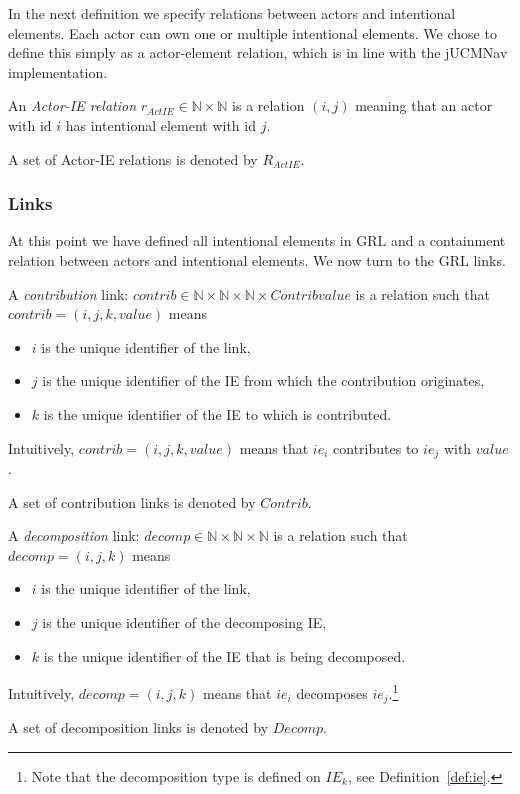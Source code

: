 In the next definition we specify relations between actors and intentional elements. Each actor can own one or multiple intentional elements. We chose to define this simply as a actor-element relation, which is in line with the jUCMNav implementation.


\begin{definition}
\label{def:act-ie-relation}
An \emph{Actor-IE relation} $r_{ActIE}\in\mathbb{N}\times\mathbb{N}$ is a relation $(i,j)$ meaning that an actor with id $i$ has intentional element with id $j$.

A set of Actor-IE relations is denoted by $R_{ActIE}$.
\end{definition}

\subsubsection{Links}

At this point we have defined all intentional elements in GRL and a containment relation between actors and intentional elements. We now turn to the GRL links.

\begin{definition}
\label{def:link:contrib}
A \emph{contribution} link: $contrib\in \mathbb{N}\times\mathbb{N}\times\mathbb{N}\times Contribvalue$ is a relation such that $contrib = (i,j,k,value)$ means
\begin{itemize}
\item $i$ is the unique identifier of the link,
\item $j$ is the unique identifier of the IE from which the contribution originates,
\item $k$ is the unique identifier of the IE to which is contributed.
\end{itemize}
Intuitively, $contrib = (i,j,k,value)$ means that $ie_i$ contributes to $ie_j$ with $value$.

A set of contribution links is denoted by $Contrib$.
\end{definition}

\begin{definition}
\label{def:link:decomp}
A \emph{decomposition} link: $decomp\in \mathbb{N}\times\mathbb{N}\times\mathbb{N}$ is a relation such that $decomp = (i,j,k)$ means
\begin{itemize}
\item $i$ is the unique identifier of the link,
\item $j$ is the unique identifier of the decomposing IE,
\item $k$ is the unique identifier of the IE that is being decomposed.
\end{itemize}
Intuitively, $decomp = (i,j,k)$ means that $ie_i$ decomposes $ie_j$.\footnote{Note that the decomposition type is defined on $IE_{k}$, see Definition~\ref{def:ie}.}

A set of decomposition links is denoted by $Decomp$.
\end{definition}

